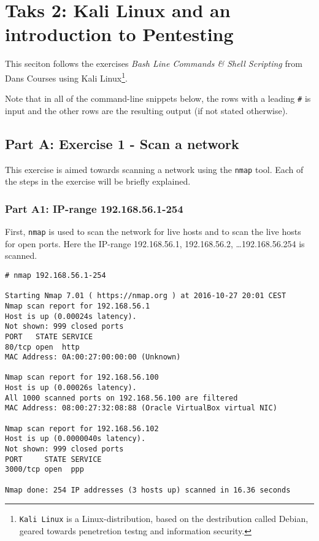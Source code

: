 \section{Taks 2: Kali Linux and an introduction to Pentesting}
This seciton follows the exercises \textit{Bash Line Commands \& Shell
  Scripting} from Dans Courses\cite{DANSCOURSES} using Kali Linux\footnote{
  \texttt{Kali Linux} is a Linux-distribution, based on the destribution
called Debian\cite{KALIDEBIAN}, geared towards penetretion testng and
information security.
}.

Note that in all of the command-line snippets below, the rows with
a leading \texttt{\#} is input and the other rows are the resulting
output (if not stated otherwise).

\subsection{Part A: Exercise 1 - Scan a network}
This exercise is aimed towards scanning a network using the
\texttt{nmap} tool. Each of the steps in the exercise will
be briefly explained.

\subsubsection{Part A1: IP-range 192.168.56.1-254}
\label{sec:parta1}
First, \texttt{nmap} is used to scan the network for live
hosts and to scan the live hosts for open ports. Here
the IP-range 192.168.56.1, 192.168.56.2, \dots 192.168.56.254
is scanned.

\begin{lstlisting}[numbers=none, language={}, frame=single, framexleftmargin={0.2em}]
# nmap 192.168.56.1-254

Starting Nmap 7.01 ( https://nmap.org ) at 2016-10-27 20:01 CEST
Nmap scan report for 192.168.56.1
Host is up (0.00024s latency).
Not shown: 999 closed ports
PORT   STATE SERVICE
80/tcp open  http
MAC Address: 0A:00:27:00:00:00 (Unknown)

Nmap scan report for 192.168.56.100
Host is up (0.00026s latency).
All 1000 scanned ports on 192.168.56.100 are filtered
MAC Address: 08:00:27:32:08:88 (Oracle VirtualBox virtual NIC)

Nmap scan report for 192.168.56.102
Host is up (0.0000040s latency).
Not shown: 999 closed ports
PORT     STATE SERVICE
3000/tcp open  ppp

Nmap done: 254 IP addresses (3 hosts up) scanned in 16.36 seconds
\end{lstlisting}

